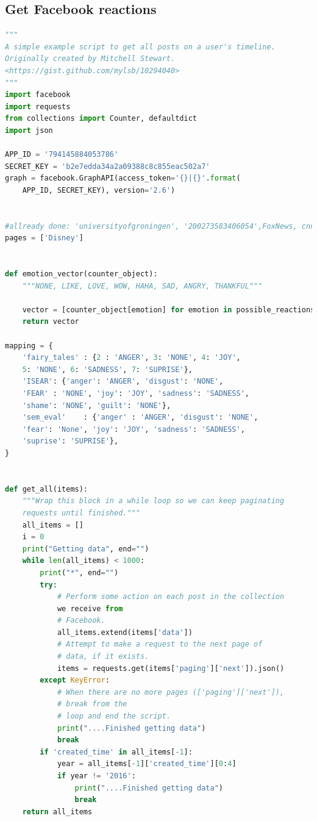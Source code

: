 \documentclass[11pt]{article}
\begin{document}
\subsection{Get Facebook reactions}
\begin{lstlisting}[language=Python]
"""
A simple example script to get all posts on a user's timeline.
Originally created by Mitchell Stewart.
<https://gist.github.com/mylsb/10294040>
"""
import facebook
import requests
from collections import Counter, defaultdict
import json

APP_ID = '794145884053786'
SECRET_KEY = 'b2e7edda34a2a09388c8c855eac502a7'
graph = facebook.GraphAPI(access_token='{}|{}'.format(
    APP_ID, SECRET_KEY), version='2.6')


#allready done: 'universityofgroningen', '200273583406054',FoxNews, cnn 
pages = ['Disney']


def emotion_vector(counter_object):
    """NONE, LIKE, LOVE, WOW, HAHA, SAD, ANGRY, THANKFUL"""
    
    vector = [counter_object[emotion] for emotion in possible_reactions]
    return vector

mapping = {
    'fairy_tales' : {2 : 'ANGER', 3: 'NONE', 4: 'JOY', 
    5: 'NONE', 6: 'SADNESS', 7: 'SUPRISE'},
    'ISEAR': {'anger': 'ANGER', 'disgust': 'NONE', 
    'FEAR' : 'NONE', 'joy': 'JOY', 'sadness': 'SADNESS',
    'shame': 'NONE', 'guilt': 'NONE'},
    'sem_eval'    : {'anger' : 'ANGER', 'disgust': 'NONE',
    'fear': 'None', 'joy': 'JOY', 'sadness': 'SADNESS',
    'suprise': 'SUPRISE'},
}


def get_all(items):
    """Wrap this block in a while loop so we can keep paginating
    requests until finished."""
    all_items = []
    i = 0
    print("Getting data", end="")
    while len(all_items) < 1000:
        print("*", end="")
        try:
            # Perform some action on each post in the collection
            we receive from
            # Facebook.
            all_items.extend(items['data'])
            # Attempt to make a request to the next page of
            # data, if it exists.
            items = requests.get(items['paging']['next']).json()
        except KeyError:
            # When there are no more pages (['paging']['next']),
            # break from the
            # loop and end the script.
            print("....Finished getting data")
            break
        if 'created_time' in all_items[-1]:
            year = all_items[-1]['created_time'][0:4]
            if year != '2016':
                print("....Finished getting data")
                break
    return all_items



\end{lstlisting}
\end{document}
